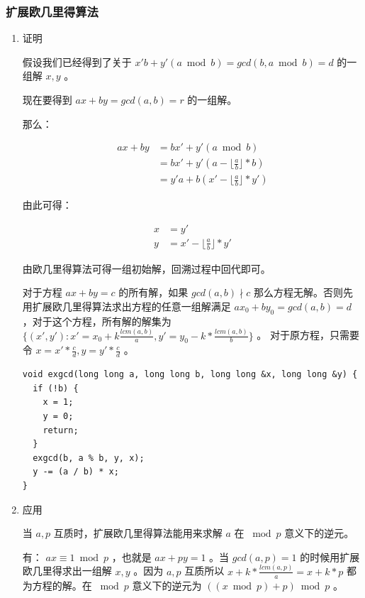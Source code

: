 \documentclass[11pt]{article}
\begin{document}
\subsubsection{扩展欧几里得算法}
\label{sec-3-3-3}
\begin{enumerate}
\item 证明
\label{sec-3-3-3-1}

假设我们已经得到了关于 $x'b+y'(a \bmod b)=gcd(b,a \bmod b)=d$ 的一组解 $x,y$ 。

现在要得到 $ax+by=gcd(a,b)=r$ 的一组解。

那么：

$$\begin{aligned}
a x + b y &= b x' + y' (a \bmod b)\\
&= bx' + y'(a - \lfloor \frac{a}{b} \rfloor * b) \\
&= y'a + b(x' - \lfloor \frac{a}{b} \rfloor*y')
\end{aligned}$$

由此可得：

$$\begin{aligned}
x &= y'\\
y &= x' - \lfloor \frac{a}{b} \rfloor * y'
\end{aligned}$$

由欧几里得算法可得一组初始解，回溯过程中回代即可。

对于方程 $ax+by=c$ 的所有解，如果 $gcd(a,b) \nmid c$ 那么方程无解。否则先用扩展欧几里得算法求出方程的任意一组解满足 $ax_0+by_0=gcd(a,b)=d$  ，对于这个方程，所有解的解集为 
$\{(x',y'): x' = x_0 + k \frac{lcm(a,b)}{a}, y'=y_0-k*\frac{lcm(a,b)}{b}\}$ 。 对于原方程，只需要令 $x=x'*\frac{c}{d},y=y'*\frac{c}{d}$ 。 

\begin{verbatim}
void exgcd(long long a, long long b, long long &x, long long &y) {
  if (!b) {
    x = 1;
    y = 0;
    return;
  }
  exgcd(b, a % b, y, x);
  y -= (a / b) * x;
}
\end{verbatim}

\item 应用
\label{sec-3-3-3-2}

当 $a, p$ 互质时，扩展欧几里得算法能用来求解 $a$ 在 $\bmod p$ 意义下的逆元。

有： $ax \equiv 1 \bmod p$  ，也就是 $ax + py = 1$  。当 $gcd(a,p)=1$ 的时候用扩展欧几里得求出一组解 $x,y$  。因为 $a,p$ 互质所以 $x+k* \frac{lcm(a,p)}{a} = x + k * p$ 都为方程的解。在 $\bmod p$ 意义下的逆元为 $((x \bmod p) + p) \bmod p$  。
\end{enumerate}
\end{document}
